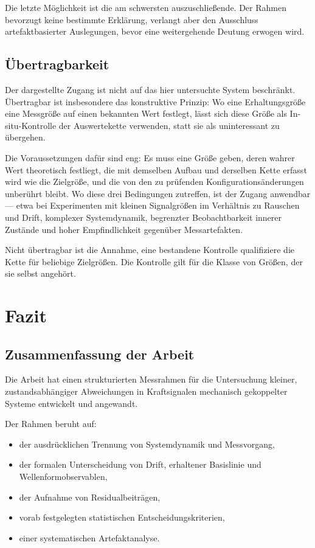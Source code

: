 \documentclass[12pt,a4paper]{report}
\begin{document}
Die letzte Möglichkeit ist die am schwersten auszuschließende. Der Rahmen
bevorzugt keine bestimmte Erklärung, verlangt aber den Ausschluss
artefaktbasierter Auslegungen, bevor eine weitergehende Deutung erwogen
wird.

\section{Übertragbarkeit}

Der dargestellte Zugang ist nicht auf das hier untersuchte System
beschränkt. Übertragbar ist insbesondere das konstruktive Prinzip: Wo
eine Erhaltungsgröße eine Messgröße auf einen bekannten Wert festlegt,
lässt sich diese Größe als In-situ-Kontrolle der Auswertekette verwenden,
statt sie als uninteressant zu übergehen.

Die Voraussetzungen dafür sind eng: Es muss eine Größe geben, deren
wahrer Wert theoretisch festliegt, die mit demselben Aufbau und derselben
Kette erfasst wird wie die Zielgröße, und die von den zu prüfenden
Konfigurationsänderungen unberührt bleibt. Wo diese drei Bedingungen
zutreffen, ist der Zugang anwendbar --- etwa bei Experimenten mit
kleinen Signalgrößen im Verhältnis zu Rauschen und Drift, komplexer
Systemdynamik, begrenzter Beobachtbarkeit innerer Zustände und hoher
Empfindlichkeit gegenüber Messartefakten.

Nicht übertragbar ist die Annahme, eine bestandene Kontrolle qualifiziere
die Kette für beliebige Zielgrößen. Die Kontrolle gilt für die Klasse von
Größen, der sie selbst angehört.



\chapter{Fazit}
\label{chap:fazit}

\section{Zusammenfassung der Arbeit}

Die Arbeit hat einen strukturierten Messrahmen für die Untersuchung
kleiner, zustandsabhängiger Abweichungen in Kraftsignalen mechanisch
gekoppelter Systeme entwickelt und angewandt.

Der Rahmen beruht auf:

\begin{itemize}
\item der ausdrücklichen Trennung von Systemdynamik und Messvorgang,
\item der formalen Unterscheidung von Drift, erhaltener Basislinie und
      Wellenformobservablen,
\item der Aufnahme von Residualbeiträgen,
\item vorab festgelegten statistischen Entscheidungskriterien,
\item einer systematischen Artefaktanalyse.
\end{itemize}
\end{document}
